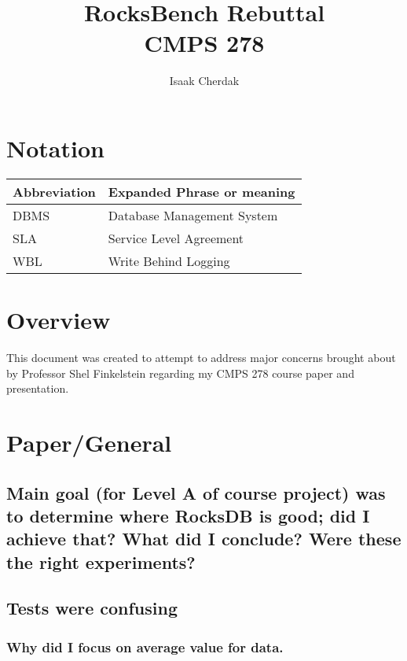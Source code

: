 \documentclass[twocolumn,11pt]{article}
\title{RocksBench Rebuttal\\CMPS 278}
\author{Isaak Cherdak}
\begin{document}
\maketitle

\pagebreak

\section*{Notation}

\begin{center}
  \begin{tabular}{ | l | l | }
    \hline
    Abbreviation & Expanded Phrase or meaning\\ \hline \hline
    DBMS & Database Management System\\ \hline
    SLA & Service Level Agreement\\ \hline
    WBL & Write Behind Logging \\ \hline
  \end{tabular}
\end{center}

\section{Overview}

This document was created to attempt to address major concerns brought about by
Professor Shel Finkelstein regarding my CMPS 278 course paper and presentation.

\section{Paper/General}

\subsection{Main goal (for Level A of course project) was to determine where
  RocksDB is good; did I achieve that? What did I conclude? Were these the
right experiments?}

\subsection{Tests were confusing}

\subsubsection{Why did I focus on average value for data.}
\end{document}
